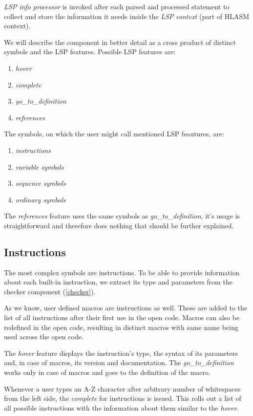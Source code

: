 \emph{LSP info processor} is invoked after each parsed and processed statement to collect and store the information it needs inside the \emph{LSP context} (part of HLASM context). 

We will describe the component in better detail as a cross product of distinct symbols and the LSP features. Possible LSP features are:
\begin{enumerate}
	\item \emph{hover}
	\item \emph{complete}
	\item \emph{go\_to\_definition}
	\item \emph{references}
\end{enumerate}
The symbols, on which the user might call mentioned LSP feautures, are:
\begin{enumerate}
	\item \emph{instructions}
	\item \emph{variable symbols}
	\item \emph{sequence symbols}
	\item \emph{ordinary symbols}
\end{enumerate}

The \emph{references} feature uses the same symbols as \emph{go\_to\_definition}, it's usage is straightforward and therefore does nothing that should be further explained.

\subsection{Instructions}

The most complex symbols are instructions. To be able to provide information about each built-in instruction, we extract its type and parameters from the checker component (\cref{checker}).

As we know, user defined macros are instructions as well. These are added to the list of all instructions after their first use in the open code. Macros can also be redefined in the open code, resulting in distinct macros with same name being used across the open code.

The \emph{hover} feature displays the instruction's type, the syntax of its parameters and, in case of macros, its version and documentation. The \emph{go\_to\_definition} works only in case of macros and goes to the definition of the macro.

Whenever a user types an A-Z character after arbitrary number of whitespaces from the left side, the \emph{complete} for instructions is issued. This rolls out a list of all possible instructions with the information about them similar to the \emph{hover}.

